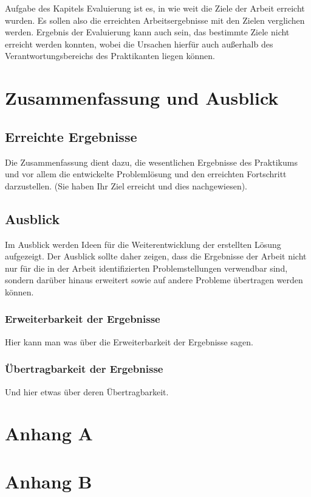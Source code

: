 \documentclass[oneside]{ausarbeitung}
\begin{document}
Aufgabe des Kapitels Evaluierung ist es, in wie weit die Ziele der 
Arbeit erreicht wurden. Es sollen also die erreichten Arbeitsergebnisse 
mit den Zielen verglichen werden. Ergebnis der Evaluierung kann auch 
sein, das bestimmte Ziele nicht erreicht werden konnten, wobei die 
Ursachen hierfür auch außerhalb des Verantwortungsbereichs des 
Praktikanten liegen können.

\chapter{Zusammenfassung und Ausblick}
\label{cha:zusammenfassung}

\section{Erreichte Ergebnisse}
\label{sec:ergebnisse}

Die Zusammenfassung dient dazu, die wesentlichen Ergebnisse des 
Praktikums und vor allem die entwickelte Problemlösung und den 
erreichten Fortschritt darzustellen. (Sie haben Ihr Ziel erreicht und 
dies nachgewiesen).

\section{Ausblick}
\label{sec:ausblick}

Im Ausblick werden Ideen für die Weiterentwicklung der erstellten Lösung 
aufgezeigt. Der Ausblick sollte daher zeigen, dass die Ergebnisse der 
Arbeit nicht nur für die in der Arbeit identifizierten Problemstellungen 
verwendbar sind, sondern darüber hinaus erweitert sowie auf andere 
Probleme übertragen werden können.

\subsection{Erweiterbarkeit der Ergebnisse}
\label{sub:erweiterbarkeit}

Hier kann man was über die Erweiterbarkeit der Ergebnisse sagen.

\subsection{Übertragbarkeit der Ergebnisse}
\label{sub:uebertragbarkeit}

Und hier etwas über deren Übertragbarkeit.

\appendix

\printbibliography[heading=bibintoc]

\chapter{Anhang A}

\chapter{Anhang B}
\end{document}
